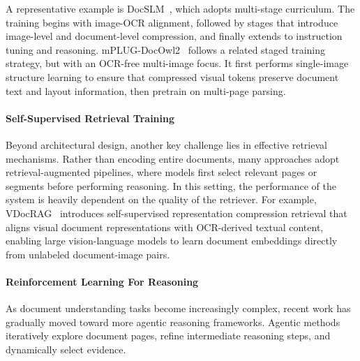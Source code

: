 \documentclass[11pt]{article}
\begin{document}
A representative example is DocSLM~\cite{Hannan2025-zu}, which adopts multi-stage curriculum. The training begins with image-OCR alignment, followed by stages that introduce image-level and document-level compression, and finally extends to instruction tuning and reasoning. mPLUG-DocOwl2~\cite{Hu2024-wl} follows a related staged training strategy, but with an OCR-free multi-image focus. It first performs single-image structure learning to ensure that compressed visual tokens preserve document text and layout information, then pretrain on multi-page parsing.

\paragraph{Self-Supervised Retrieval Training}
Beyond architectural design, another key challenge lies in effective retrieval mechanisms. Rather than encoding entire documents, many approaches adopt retrieval-augmented pipelines, where models first select relevant pages or segments before performing reasoning. In this setting, the performance of the system is heavily dependent on the quality of the retriever. For example, VDocRAG~\cite{Tanaka2025-er} introduces self-supervised representation compression retrieval that aligns visual document representations with OCR-derived textual content, enabling large vision-language models to learn document embeddings directly from unlabeled document-image pairs. 

\paragraph{Reinforcement Learning For Reasoning}
As document understanding tasks become increasingly complex, recent work has gradually moved toward more agentic reasoning frameworks. Agentic methods iteratively explore document pages, refine intermediate reasoning steps, and dynamically select evidence.
\end{document}
